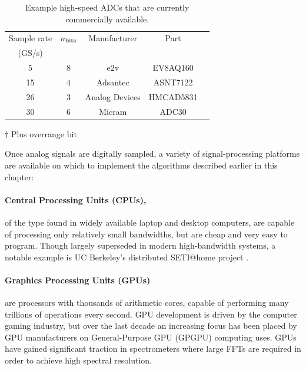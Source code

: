 \documentclass{ws-rv961x669}
\begin{document}
\begin{table}
\begin{center}
\begin{threeparttable}
	\caption{Example high-speed ADCs that are currently commercially available. \label{tab:adcs}}
	\begin{tabular}{c c c c c}
	\hline
	Sample rate  & $n_{\rm{bits}}$ & Manufacturer & Part  \\
	(GS/s)  & & & \\
    \hline
    5 &  8 & e2v & EV8AQ160 \\
	15 &  4 & Adsantec & ASNT7122  \\
	26 &  3\tnote{$\dag$} & Analog Devices & HMCAD5831  \\
	30 &  6 & Micram & ADC30 \\
	\hline
	\end{tabular}
	
  \begin{tablenotes}
  \item[$\dag$] Plus overrange bit
  \end{tablenotes}

\end{threeparttable}
\end{center}
\end{table}

Once analog signals are digitally sampled, a variety of signal-processing platforms are available on which to implement the algorithms described earlier in this chapter:

\paragraph{Central Processing Units (CPUs),} of the type found in widely available laptop and desktop computers, are capable of processing only relatively small bandwidths, but are cheap and very easy to program. Though largely superseded in modern high-bandwidth systems, a notable example is UC Berkeley's distributed SETI@home project \citep{Anderson2002}.


\paragraph{Graphics Processing Units (GPUs)} are processors with thousands of arithmetic cores, capable of performing many trillions of operations every second.
GPU development is driven by the computer gaming industry, but over the last decade an increasing focus has been placed by GPU manufacturers on General-Purpose GPU (GPGPU) computing uses. GPUs have gained significant traction in spectrometers where large FFTs are required in order to achieve high spectral resolution\cite{Kondo2010}.
\end{document}
